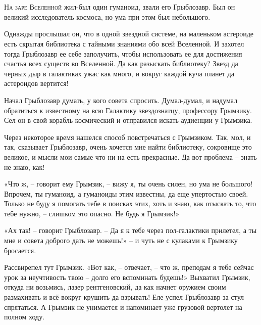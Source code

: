 \documentclass[ebook,oneside,final,openright]{memoir}
\begin{document}
\chapter{}
 \lettrine{Н}{а заре Вселенной} жил-был один гуманоид, звали его Грыблозавр. Был он великий исследователь космоса, но ума при этом был небольшого.\par
\par
Однажды прослышал он, что в одной звездной системе, на маленьком астероиде есть скрытая библиотека с тайными знаниями обо всей Вселенной. И захотел тогда Грыблозавр ее себе заполучить, чтобы использовать ее для достижения счастья всех существ во Вселенной. Да как разыскать библиотеку? Звезд да черных дыр в галактиках ужас как много, и вокруг каждой куча планет да астероидов вертится!\par
\par
Начал Грыблозавр думать, у кого совета спросить. Думал-думал, и надумал обратиться к известному на всю Галактику звездознатцу, профессору Грымзику. Сел он в свой корабль космический и отправился искать аудиенции у Грымзика.\par
\par
Через некоторое время нашелся способ повстречаться с Грымзиком. Так, мол, и так, сказывает Грыблозавр, очень хочется мне найти библиотеку, сокровище это великое, и мысли мои самые что ни на есть прекрасные. Да вот проблема – знать не знаю, как!\par
\par
«Что ж, – говорит ему Грымзик, – вижу я, ты очень силен, но ума не большого! Впрочем, ты гуманоид, а гуманоиды этим известны, да еще упертостью своей. Только не буду я помогать тебе в поисках этих, хоть и знаю, как отыскать то, что тебе нужно, – слишком это опасно. Не будь я Грымзик!» \par
\par
«Ах так! – говорит Грыблозавр. – Да я к тебе через пол-галактики прилетел, а ты мне и совета доброго дать не можешь!» – и чуть не с кулаками к Грымзику бросается. \par
\par
Рассвирепел тут Грымзик. «Вот как, – отвечает, – что ж, преподам я тебе сейчас урок за неучтивость твою – долго его вспоминать будешь!» Выхватил Грымзик, откуда ни возьмись, лазер рентгеновский, да как начнет оружием своим размахивать и всё вокруг крушить да взрывать! Еле успел Грыблозавр за стул спрятаться. А Грымзик не унимается и напоминает уже грузовой вертолет на полном ходу. \par
\par
\end{document}
